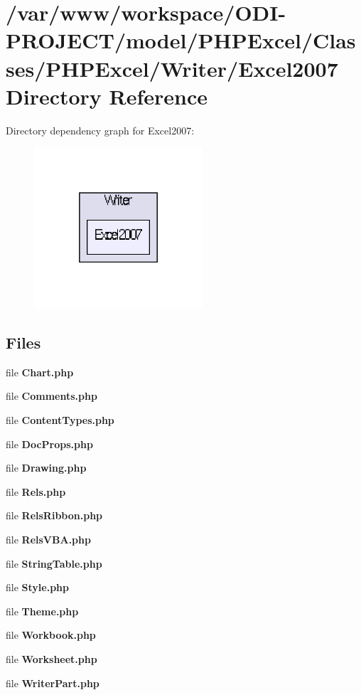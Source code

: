 \section{/var/www/workspace/\+O\+D\+I-\/\+P\+R\+O\+J\+E\+C\+T/model/\+P\+H\+P\+Excel/\+Classes/\+P\+H\+P\+Excel/\+Writer/\+Excel2007 Directory Reference}
\label{dir_23134f35193923ae5775ddc6f68bd390}
Directory dependency graph for Excel2007\+:\nopagebreak
\begin{figure}[H]
\begin{center}
\leavevmode
\includegraphics[width=178pt]{dir_23134f35193923ae5775ddc6f68bd390_dep}
\end{center}
\end{figure}
\subsection*{Files}
\begin{DoxyCompactItemize}
\item 
file {\bfseries Chart.\+php}
\item 
file {\bfseries Comments.\+php}
\item 
file {\bfseries Content\+Types.\+php}
\item 
file {\bfseries Doc\+Props.\+php}
\item 
file {\bfseries Drawing.\+php}
\item 
file {\bfseries Rels.\+php}
\item 
file {\bfseries Rels\+Ribbon.\+php}
\item 
file {\bfseries Rels\+V\+B\+A.\+php}
\item 
file {\bfseries String\+Table.\+php}
\item 
file {\bfseries Style.\+php}
\item 
file {\bfseries Theme.\+php}
\item 
file {\bfseries Workbook.\+php}
\item 
file {\bfseries Worksheet.\+php}
\item 
file {\bfseries Writer\+Part.\+php}
\end{DoxyCompactItemize}

